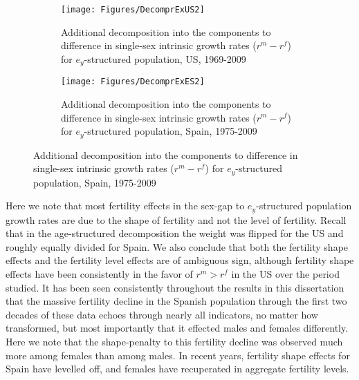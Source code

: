\begin{figure}
        \centering
        \begin{subfigure}
                \centering
                \caption{Additional decomposition into the components
                to difference in single-sex intrinsic growth rates
                ($r^m - r^f$) for $e_y$-structured population, US, 1969-2009}
                \texttt{[image: Figures/DecomprExUS2]}
                \label{fig:exDecomprUS2}
        \end{subfigure}
        \begin{subfigure}
                \centering
                \caption{Additional decomposition into the components to difference in single-sex intrinsic growth
                rates ($r^m - r^f$) for $e_y$-structured population, Spain,
                1975-2009}
                \texttt{[image: Figures/DecomprExES2]}
                \label{fig:exDecomprES2}
        \end{subfigure}
\end{figure}

 Here we note that most fertility effects in the sex-gap to $e_y$-structured
 population growth rates are due to the shape of fertility and not the level of
 fertility. Recall that in the age-structured decomposition the weight was
 flipped for the US and roughly equally divided for Spain. We also conclude that
 both the fertility shape effects and the fertility level effects are of
 ambiguous sign, although fertility shape effects have been
 consistently in the favor of $r^m > r^f$ in the US over the period studied. It
 has been seen consistently throughout the results in this dissertation that
 the massive fertility decline in the Spanish population through the first two
 decades of these data echoes through nearly all indicators, no matter how
 transformed, but most importantly that it effected males and females differently. 
 Here we note that the shape-penalty to
 this fertility decline was observed much more among females than among males.
 In recent years, fertility shape effects for Spain have levelled off, and
 females have recuperated in aggregate fertility levels.
 
